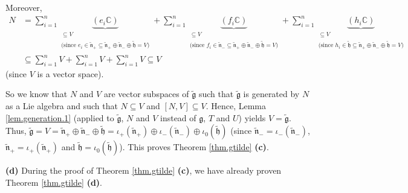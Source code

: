 \documentclass[etingof-lie.tex]{subfiles}
\begin{document}
Moreover,
\begin{align*}
N  &  =\sum\limits_{i=1}^{n}\underbrace{\left(  e_{i}\mathbb{C}\right)
}_{\substack{\subseteq V\\\text{(since }e_{i}\in\widetilde{\mathfrak{n}}%
_{+}\subseteq\widetilde{\mathfrak{n}}_{+}\oplus\widetilde{\mathfrak{n}}%
_{-}\oplus\widetilde{\mathfrak{h}}=V\text{)}}}+\sum\limits_{i=1}%
^{n}\underbrace{\left(  f_{i}\mathbb{C}\right)  }_{\substack{\subseteq
V\\\text{(since }f_{i}\in\widetilde{\mathfrak{n}}_{-}\subseteq
\widetilde{\mathfrak{n}}_{+}\oplus\widetilde{\mathfrak{n}}_{-}\oplus
\widetilde{\mathfrak{h}}=V\text{)}}}+\sum\limits_{i=1}^{n}\underbrace{\left(
h_{i}\mathbb{C}\right)  }_{\substack{\subseteq V\\\text{(since }h_{i}%
\in\widetilde{\mathfrak{h}}\subseteq\widetilde{\mathfrak{n}}_{+}%
\oplus\widetilde{\mathfrak{n}}_{-}\oplus\widetilde{\mathfrak{h}}=V\text{)}}}\\
&  \subseteq\sum\limits_{i=1}^{n}V+\sum\limits_{i=1}^{n}V+\sum\limits_{i=1}%
^{n}V\subseteq V
\end{align*}
(since $V$ is a vector space).

So we know that $N$ and $V$ are vector subspaces of $\widetilde{\mathfrak{g}}$
such that $\widetilde{\mathfrak{g}}$ is generated by $N$ as a Lie algebra and
such that $N\subseteq V$ and $\left[  N,V\right]  \subseteq V$. Hence, Lemma
\ref{lem.generation.1} (applied to $\widetilde{\mathfrak{g}}$, $N$ and $V$
instead of $\mathfrak{g}$, $T$ and $U$) yields $V=\widetilde{\mathfrak{g}}$.
Thus, $\widetilde{\mathfrak{g}}=V=\widetilde{\mathfrak{n}}_{+}\oplus
\widetilde{\mathfrak{n}}_{-}\oplus\widetilde{\mathfrak{h}}=\iota_{+}\left(
\widetilde{\mathfrak{n}}_{+}\right)  \oplus\iota_{-}\left(
\widetilde{\mathfrak{n}}_{-}\right)  \oplus\iota_{0}\left(
\widetilde{\mathfrak{h}}\right)  $ (since $\widetilde{\mathfrak{n}}_{-}%
=\iota_{-}\left(  \widetilde{\mathfrak{n}}_{-}\right)  $,
$\widetilde{\mathfrak{n}}_{+}=\iota_{+}\left(  \widetilde{\mathfrak{n}}%
_{+}\right)  $ and $\widetilde{\mathfrak{h}}=\iota_{0}\left(
\widetilde{\mathfrak{h}}\right)  $). This proves Theorem \ref{thm.gtilde}
\textbf{(c)}.

\bigskip

\textbf{(d)} During the proof of Theorem \ref{thm.gtilde} \textbf{(c)}, we
have already proven Theorem \ref{thm.gtilde} \textbf{(d)}.

\bigskip
\end{document}
